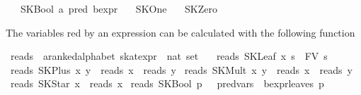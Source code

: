 \begin{isabellebody}
\ \ {}\ SKBool\ {}{}a\ pred\ bexpr{}\isanewline
\ \ {}\ SKOne\isanewline
\ \ {}\ SKZero%
\begin{isamarkuptext}%
The variables red by an expression can be calculated with the following function%
\end{isamarkuptext}%
\isamarkuptrue%
\isamarkupfalse%
\ reads\ {}{}\ {}{}a{}{}ranked{}alphabet\ skat{}expr\ {}\ nat\ set{}\ \isanewline
\ \ {}reads\ {}SKLeaf\ x\ s{}\ {}\ FV\ s{}\isanewline
{}\ {}reads\ {}SKPlus\ x\ y{}\ {}\ reads\ x\ {}\ reads\ y{}\isanewline
{}\ {}reads\ {}SKMult\ x\ y{}\ {}\ reads\ x\ {}\ reads\ y{}\isanewline
{}\ {}reads\ {}SKStar\ x{}\ {}\ reads\ x{}\isanewline
{}\ {}reads\ {}SKBool\ p{}\ {}\ {}\ {}pred{}vars\ {}\ bexpr{}leaves\ p{}{}\isanewline

\end{isabellebody}
